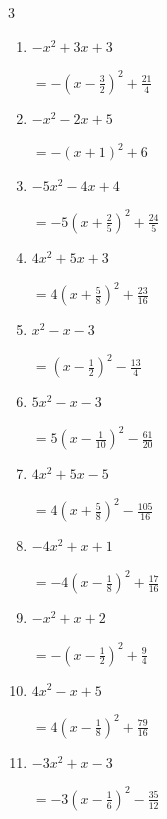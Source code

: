\begin{multicols}{3}
\begin{enumerate}
        $\displaystyle =2\left( x+\frac{1}{4}\right)^{2}+\frac{15}{8}$

  \item $-x^{2}+3x+3$

        $\displaystyle =-\left( x-\frac{3}{2}\right)^{2}+\frac{21}{4}$

  \item $-x^{2}-2x+5$

        $\displaystyle =-\left( x+1\right)^{2}+6$

  \item $-5x^{2}-4x+4$

        $\displaystyle =-5\left( x+\frac{2}{5}\right)^{2}+\frac{24}{5}$

\columnbreak %

  \item $4x^{2}+5x+3$

        $\displaystyle =4\left( x+\frac{5}{8}\right)^{2}+\frac{23}{16}$

  \item $x^{2}-x-3$

        $\displaystyle =\left( x-\frac{1}{2}\right)^{2}-\frac{13}{4}$

  \item $5x^{2}-x-3$

        $\displaystyle =5\left( x-\frac{1}{10}\right)^{2}-\frac{61}{20}$

  \item $4x^{2}+5x-5$

        $\displaystyle =4\left( x+\frac{5}{8}\right)^{2}-\frac{105}{16}$

  \item $-4x^{2}+x+1$

        $\displaystyle =-4\left( x-\frac{1}{8}\right)^{2}+\frac{17}{16}$

\columnbreak %

\resetques

  \item $-x^{2}+x+2$

        $\displaystyle =-\left( x-\frac{1}{2}\right)^{2}+\frac{9}{4}$

  \item $4x^{2}-x+5$

        $\displaystyle =4\left( x-\frac{1}{8}\right)^{2}+\frac{79}{16}$

  \item $-3x^{2}+x-3$

        $\displaystyle =-3\left( x-\frac{1}{6}\right)^{2}-\frac{35}{12}$


\end{enumerate}
\end{multicols}

